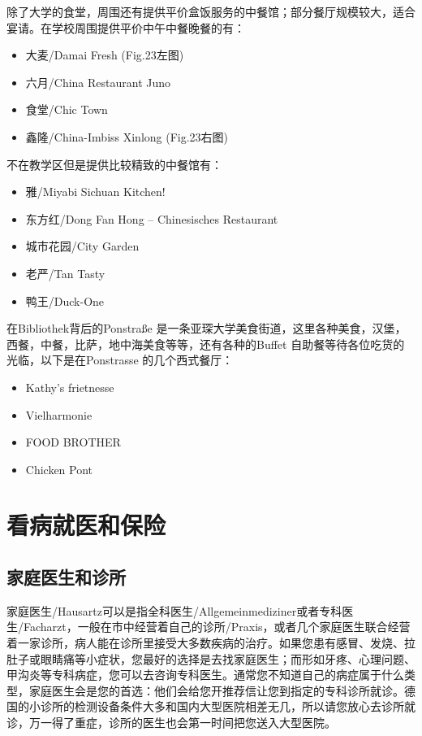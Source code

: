     除了大学的食堂，周围还有提供平价盒饭服务的中餐馆；部分餐厅规模较大，适合宴请。在学校周围提供平价中午中餐晚餐的有：

    \begin{itemize}
      \item 大麦/Damai Fresh (Fig.23左图)
      \item 六月/China Restaurant Juno
      \item 食堂/Chic Town
      \item 鑫隆/China-Imbiss Xinlong (Fig.23右图)
    \end{itemize}

    不在教学区但是提供比较精致的中餐馆有：

    \begin{itemize}
      \item 雅/Miyabi Sichuan Kitchen! 
      \item 东方红/Dong Fan Hong – Chinesisches Restaurant
      \item 城市花园/City Garden
      \item 老严/Tan Tasty
      \item 鸭王/Duck-One
    \end{itemize}

    在Bibliothek背后的Ponstraße 是一条亚琛大学美食街道，这里各种美食，汉堡，西餐，中餐，比萨，地中海美食等等，还有各种的Buffet 自助餐等待各位吃货的光临，以下是在Ponstrasse 的几个西式餐厅：

    \begin{itemize}
      \item Kathy’s frietnesse
      \item Vielharmonie 
      \item FOOD BROTHER
      \item Chicken Pont
    \end{itemize}

\section{看病就医和保险}\label{sec:看病就医和保险}

  \subsection{家庭医生和诊所}\label{subsec:家庭医生和诊所}

    家庭医生/Hausartz可以是指全科医生/Allgemeinmediziner或者专科医生/Facharzt，一般在市中经营着自己的诊所/Praxis，或者几个家庭医生联合经营着一家诊所，病人能在诊所里接受大多数疾病的治疗。如果您患有感冒、发烧、拉肚子或眼睛痛等小症状，您最好的选择是去找家庭医生；而形如牙疼、心理问题、甲沟炎等专科病症，您可以去咨询专科医生。通常您不知道自己的病症属于什么类型，家庭医生会是您的首选：他们会给您开推荐信让您到指定的专科诊所就诊。德国的小诊所的检测设备条件大多和国内大型医院相差无几，所以请您放心去诊所就诊，万一得了重症，诊所的医生也会第一时间把您送入大型医院。

